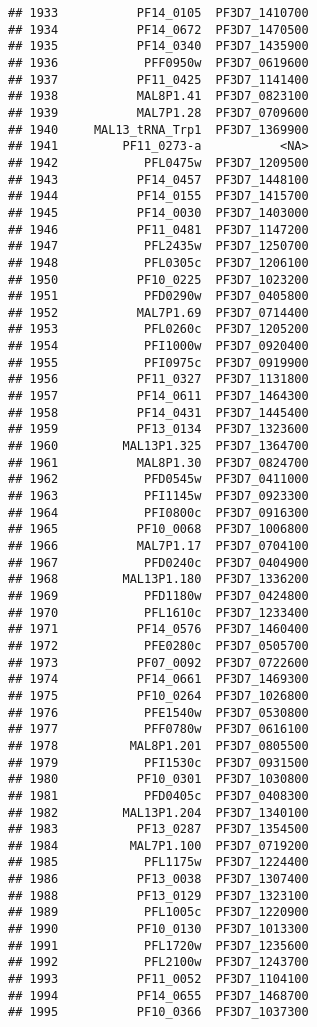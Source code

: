 \documentclass{article}\usepackage[]{graphicx}\usepackage[]{color}
\makeatletter
\newenvironment{kframe}{%
 \def\at@end@of@kframe{}%
 \ifinner\ifhmode%
  \def\at@end@of@kframe{\end{minipage}}%
  \begin{minipage}{\columnwidth}%
 \fi\fi%
 \def\FrameCommand##1{\hskip\@totalleftmargin \hskip-\fboxsep
 \colorbox{shadecolor}{##1}\hskip-\fboxsep
     \hskip-\linewidth \hskip-\@totalleftmargin \hskip\columnwidth}%
 \MakeFramed {\advance\hsize-\width
   \@totalleftmargin\z@ \linewidth\hsize
   \@setminipage}}%
 {\par\unskip\endMakeFramed%
 \at@end@of@kframe}
\newenvironment{knitrout}{}{} %
\makeatother
\begin{document}
\begin{knitrout}
\begin{kframe}
\begin{verbatim}
## 1933           PF14_0105  PF3D7_1410700
## 1934           PF14_0672  PF3D7_1470500
## 1935           PF14_0340  PF3D7_1435900
## 1936            PFF0950w  PF3D7_0619600
## 1937           PF11_0425  PF3D7_1141400
## 1938           MAL8P1.41  PF3D7_0823100
## 1939           MAL7P1.28  PF3D7_0709600
## 1940     MAL13_tRNA_Trp1  PF3D7_1369900
## 1941         PF11_0273-a           <NA>
## 1942            PFL0475w  PF3D7_1209500
## 1943           PF14_0457  PF3D7_1448100
## 1944           PF14_0155  PF3D7_1415700
## 1945           PF14_0030  PF3D7_1403000
## 1946           PF11_0481  PF3D7_1147200
## 1947            PFL2435w  PF3D7_1250700
## 1948            PFL0305c  PF3D7_1206100
## 1950           PF10_0225  PF3D7_1023200
## 1951            PFD0290w  PF3D7_0405800
## 1952           MAL7P1.69  PF3D7_0714400
## 1953            PFL0260c  PF3D7_1205200
## 1954            PFI1000w  PF3D7_0920400
## 1955            PFI0975c  PF3D7_0919900
## 1956           PF11_0327  PF3D7_1131800
## 1957           PF14_0611  PF3D7_1464300
## 1958           PF14_0431  PF3D7_1445400
## 1959           PF13_0134  PF3D7_1323600
## 1960         MAL13P1.325  PF3D7_1364700
## 1961           MAL8P1.30  PF3D7_0824700
## 1962            PFD0545w  PF3D7_0411000
## 1963            PFI1145w  PF3D7_0923300
## 1964            PFI0800c  PF3D7_0916300
## 1965           PF10_0068  PF3D7_1006800
## 1966           MAL7P1.17  PF3D7_0704100
## 1967            PFD0240c  PF3D7_0404900
## 1968         MAL13P1.180  PF3D7_1336200
## 1969            PFD1180w  PF3D7_0424800
## 1970            PFL1610c  PF3D7_1233400
## 1971           PF14_0576  PF3D7_1460400
## 1972            PFE0280c  PF3D7_0505700
## 1973           PF07_0092  PF3D7_0722600
## 1974           PF14_0661  PF3D7_1469300
## 1975           PF10_0264  PF3D7_1026800
## 1976            PFE1540w  PF3D7_0530800
## 1977            PFF0780w  PF3D7_0616100
## 1978          MAL8P1.201  PF3D7_0805500
## 1979            PFI1530c  PF3D7_0931500
## 1980           PF10_0301  PF3D7_1030800
## 1981            PFD0405c  PF3D7_0408300
## 1982         MAL13P1.204  PF3D7_1340100
## 1983           PF13_0287  PF3D7_1354500
## 1984          MAL7P1.100  PF3D7_0719200
## 1985            PFL1175w  PF3D7_1224400
## 1986           PF13_0038  PF3D7_1307400
## 1988           PF13_0129  PF3D7_1323100
## 1989            PFL1005c  PF3D7_1220900
## 1990           PF10_0130  PF3D7_1013300
## 1991            PFL1720w  PF3D7_1235600
## 1992            PFL2100w  PF3D7_1243700
## 1993           PF11_0052  PF3D7_1104100
## 1994           PF14_0655  PF3D7_1468700
## 1995           PF10_0366  PF3D7_1037300

\end{verbatim}
\end{kframe}
\end{knitrout}
\end{document}
